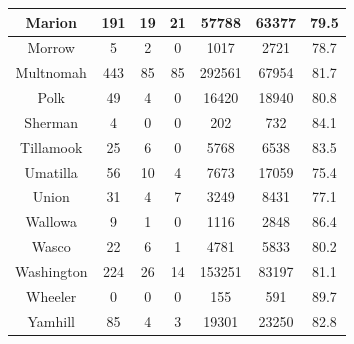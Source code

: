 \documentclass[
  english,
  man]{apa6}
\begin{document}
\begin{table}
\begin{tabular}[t]{c|c|c|c|c|c|c}
\hline
Marion & 191 & 19 & 21 & 57788 & 63377 & 79.5\\
\hline
Morrow & 5 & 2 & 0 & 1017 & 2721 & 78.7\\
\hline
Multnomah & 443 & 85 & 85 & 292561 & 67954 & 81.7\\
\hline
Polk & 49 & 4 & 0 & 16420 & 18940 & 80.8\\
\hline
Sherman & 4 & 0 & 0 & 202 & 732 & 84.1\\
\hline
Tillamook & 25 & 6 & 0 & 5768 & 6538 & 83.5\\
\hline
Umatilla & 56 & 10 & 4 & 7673 & 17059 & 75.4\\
\hline
Union & 31 & 4 & 7 & 3249 & 8431 & 77.1\\
\hline
Wallowa & 9 & 1 & 0 & 1116 & 2848 & 86.4\\
\hline
Wasco & 22 & 6 & 1 & 4781 & 5833 & 80.2\\
\hline
Washington & 224 & 26 & 14 & 153251 & 83197 & 81.1\\
\hline
Wheeler & 0 & 0 & 0 & 155 & 591 & 89.7\\
\hline
Yamhill & 85 & 4 & 3 & 19301 & 23250 & 82.8\\
\hline
\end{tabular}
\end{table}
\end{document}

